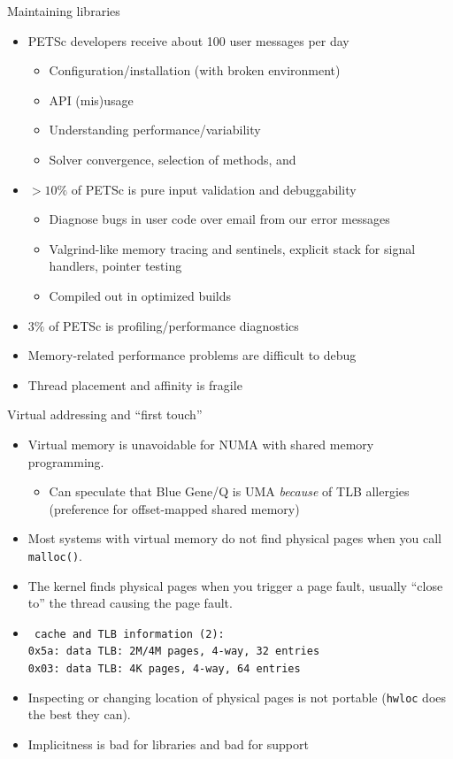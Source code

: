 \documentclass{beamer}
\begin{document}
\begin{frame}{Maintaining libraries}
  \begin{itemize}
  \item PETSc developers receive about 100 user messages per day
    \begin{itemize}
    \item Configuration/installation (with broken environment)
    \item API (mis)usage
    \item Understanding performance/variability
    \item Solver convergence, selection of methods, and 
    \end{itemize}
  \item $>10\%$ of PETSc is pure input validation and debuggability
    \begin{itemize}
    \item Diagnose bugs in user code over email from our error messages
    \item Valgrind-like memory tracing and sentinels, explicit stack for signal handlers, pointer testing
    \item Compiled out in optimized builds
    \end{itemize}
  \item $3\%$ of PETSc is profiling/performance diagnostics
  \item Memory-related performance problems are \alert<2>{difficult to debug}
  \item Thread placement and affinity is \alert<3>{fragile}
  \end{itemize}
\end{frame}

\begin{frame}{Virtual addressing and ``first touch''}
  \begin{itemize}
  \item Virtual memory is unavoidable for NUMA with shared memory programming.
    \begin{itemize}
    \item Can speculate that Blue Gene/Q is UMA \emph{because} of TLB allergies (preference for offset-mapped shared memory)
    \end{itemize}
  \item Most systems with virtual memory do not find physical pages when you call \texttt{malloc()}.
  \item The kernel finds physical pages when you trigger a page fault, usually ``close to'' the thread causing the page fault.
  \item \texttt{
      cache and TLB information (2): \\
      \quad 0x5a: data TLB: 2M/4M pages, 4-way, 32 entries \\
      \quad 0x03: data TLB: 4K pages, 4-way, 64 entries}
  \item Inspecting or changing location of physical pages is not portable (\texttt{hwloc} does the best they can).
  \item<2> \alert{Implicitness} is bad for libraries and bad for support
  \end{itemize}
\end{frame}
\end{document}
